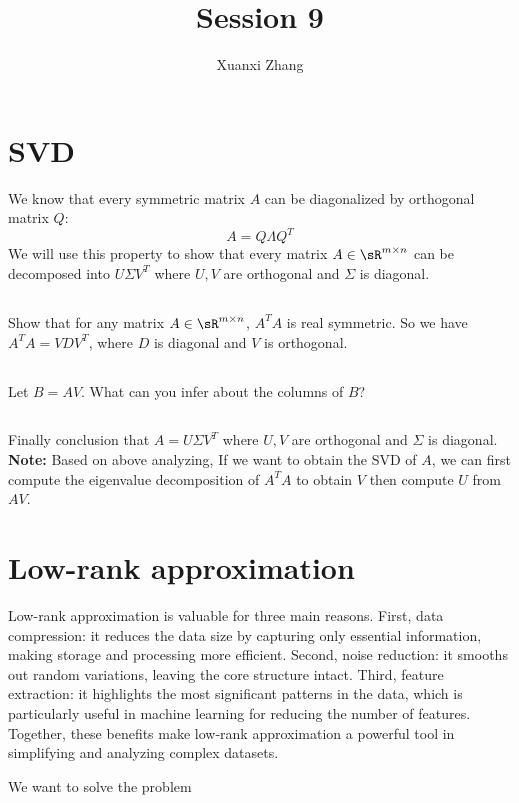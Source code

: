 \documentclass{article}%
\title{\huge Session 9\\
\normalsize}
\author{Xuanxi Zhang}
\begin{document}
\maketitle

\section{SVD}
We know that every symmetric matrix $A$ can be diagonalized by orthogonal matrix $Q$:
$$
A=Q\Lambda Q^T
$$
We will use this property to show that every matrix $A\in \sR^{m\times n}$ can be decomposed into $U\Sigma V^T$ where $U,V$ are orthogonal and $\Sigma$ is diagonal.
\subsection{}
Show that for any matrix $A\in \sR^{m\times n}$, $A^TA$ is real symmetric. So we have $A^TA=VDV^T$, where $D$ is diagonal and $V$ is orthogonal.
\subsection{}
Let $B=AV$. What can you infer about the columns of $B$?
\subsection{}
Finally conclusion that $A=U\Sigma V^T$ where $U,V$ are orthogonal and $\Sigma$ is diagonal.
\textbf{Note: }Based on above analyzing, If we want to obtain the SVD of $A$, we can first compute the eigenvalue decomposition of $A^TA$ to obtain $V$  then compute $U$ from $AV$.



\section{Low-rank approximation}
Low-rank approximation is valuable for three main reasons. First, data compression: it reduces the data size by capturing only essential information, making storage and processing more efficient. Second, noise reduction: it smooths out random variations, leaving the core structure intact. Third, feature extraction: it highlights the most significant patterns in the data, which is particularly useful in machine learning for reducing the number of features. Together, these benefits make low-rank approximation a powerful tool in simplifying and analyzing complex datasets.

We want to solve the problem 
\end{document}
